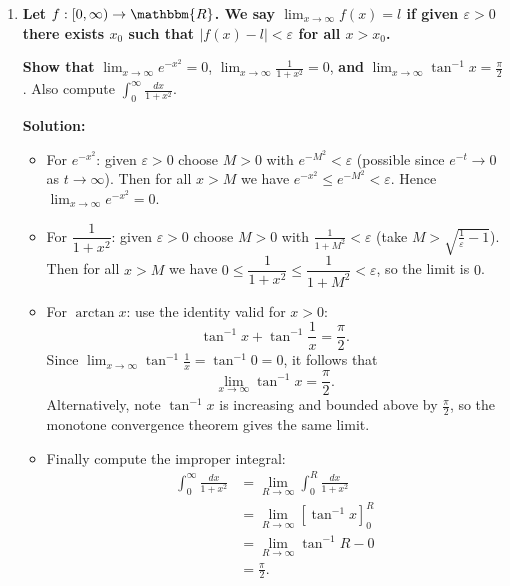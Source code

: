 \documentclass[14pt]{extarticle}
\begin{document}
\begin{enumerate}
\begin{enumerate}
\end{enumerate}

\newpage

\bigskip
\item \textbf{Let $f:[0,\infty)\to\mathbbm{R}$. We say $\lim_{x\to\infty}f(x)=l$ if given $\varepsilon>0$ there exists $x_0$ such that $|f(x)-l|<\varepsilon$ for all $x>x_0$.}

\textbf{Show that } $\lim_{x\to\infty} e^{-x^2}=0$, $\lim_{x\to\infty}\frac{1}{1+x^2}=0$, 
\textbf{and } $\lim_{x\to\infty}\tan^{-1}x=\frac{\pi}{2}$. Also compute $\displaystyle\int_0^{\infty}\frac{dx}{1+x^2}$. 

\textbf{Solution:}
\begin{itemize}
\item For $e^{-x^2}$: given $\varepsilon>0$ choose $M>0$ with $e^{-M^2}<\varepsilon$ (possible since $e^{-t}\to0$ as $t\to\infty$). Then for all $x>M$ we have $e^{-x^2}\le e^{-M^2}<\varepsilon$. Hence $\lim_{x\to\infty}e^{-x^2}=0$.

\item For $\dfrac{1}{1+x^2}$: given $\varepsilon>0$ choose $M>0$ with $\frac{1}{1+M^2}<\varepsilon$ (take $M>\sqrt{\frac{1}{\varepsilon}-1}$). Then for all $x>M$ we have $0\le\dfrac{1}{1+x^2}\le\dfrac{1}{1+M^2}<\varepsilon$, so the limit is $0$.

\item For $\arctan x$: use the identity valid for $x>0$:
\[\tan^{-1} x + \tan^{-1}\frac{1}{x} = \frac{\pi}{2}.
\]
Since $\lim_{x\to\infty}\tan^{-1}\frac{1}{x}=\tan^{-1} 0=0$, it follows that
\[\lim_{x\to\infty}\tan^{-1} x = \frac{\pi}{2}.
\]
Alternatively, note $\tan^{-1} x$ is increasing and bounded above by $\tfrac{\pi}{2}$, so the monotone convergence theorem gives the same limit.

\newpage

\item Finally compute the improper integral:
\begin{align*}
\int_0^{\infty}\frac{dx}{1+x^2} &= \lim_{R\to\infty}\int_0^R\frac{dx}{1+x^2} \\ &= \lim_{R\to\infty}[\tan^{-1} x]_0^R \\ &= \lim_{R\to\infty}\tan^{-1} R - 0 \\ &= \frac{\pi}{2}.
\end{align*}
\end{itemize}

\end{enumerate}
\end{document}
